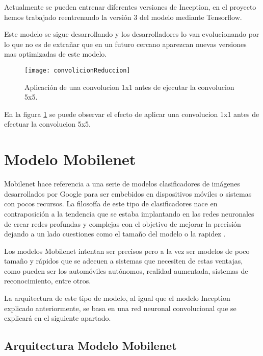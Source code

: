 Actualmente se pueden entrenar diferentes versiones de Inception, en el proyecto hemos trabajado reentrenando la versión 3 del modelo mediante Tensorflow.

Este modelo se sigue desarrollando y los desarrolladores lo van evolucionando por lo que no es de extrañar que en un futuro cercano aparezcan nuevas versiones mas optimizadas de este modelo.

\begin{figure}[h]
    \begin{center}%
        \begin{center}%
          \texttt{[image: convolicionReduccion]}%
          \caption[Aplicación convoluciones]{Aplicación de una convolucion 1x1 antes de ejecutar la convolucion 5x5.}%
          \label{figconvolicionReduccion}%
        \end{center}%
  	\end{center}%
\end{figure}%

En la figura \ref{figconvolicionReduccion} se puede observar el efecto de aplicar una convolucion 1x1 antes de efectuar la convolucion 5x5.

\section{Modelo Mobilenet}

Mobilenet hace referencia a una serie de modelos clasificadores de imágenes desarrollados por Google para ser embebidos en dispositivos móviles o sistemas con pocos recursos. La filosofía de este tipo de clasificadores nace en contraposición a la tendencia que se estaba implantando en las redes neuronales de crear redes profundas y complejas con el objetivo de mejorar la precisión dejando a un lado cuestiones como el tamaño del modelo o la rapidez \cite{mobilenet}.

Los modelos Mobilenet intentan ser precisos pero a la vez ser modelos de poco tamaño y rápidos que se adecuen a sistemas que necesiten de estas ventajas, como pueden ser los automóviles autónomos, realidad aumentada, sistemas de reconocimiento, entre otros.

La arquitectura de este tipo de modelo, al igual que el modelo Inception explicado anteriormente, se basa en una red neuronal convolucional que se explicará en el siguiente apartado.

\subsection{Arquitectura Modelo Mobilenet}

